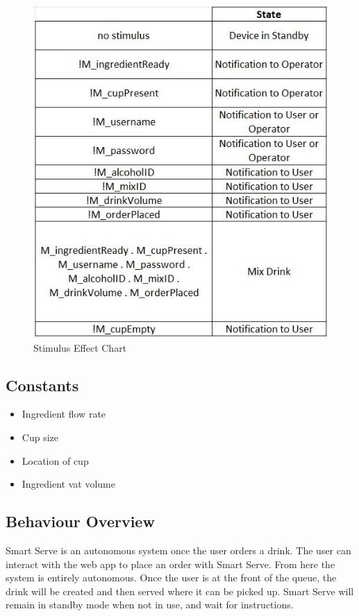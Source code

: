 \documentclass{article}
\begin{document}
    \begin{figure}[H]
    \centerline{\includegraphics[scale=0.9]{StimulusEffect.JPG}}
    \caption{Stimulus Effect Chart}
    \label{fig}
    \end{figure}

\subsection{Constants}
    \begin{itemize}
        \item Ingredient flow rate
        \item Cup size
        \item Location of cup
        \item Ingredient vat volume
    \end{itemize}

\subsection{Behaviour Overview}
    Smart Serve is an autonomous system once the user orders a drink. The user can interact with the web app to place an order with Smart Serve. From here the system is entirely autonomous. Once the user is at the front of the queue, the drink will be created and then served where it can be picked up. Smart Serve will remain in standby mode when not in use, and wait for instructions.
\end{document}
